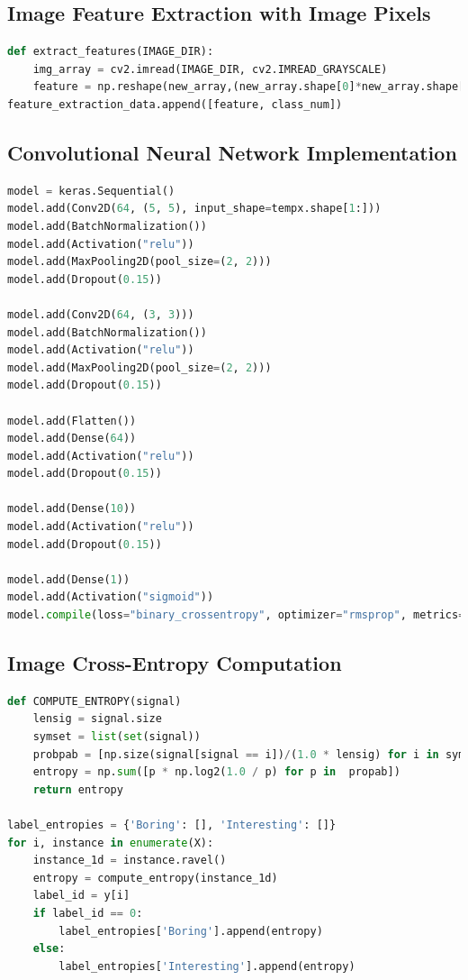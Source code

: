 \documentclass[12pt]{article}
\numberwithin{figure}{section} %
\begin{document}
\subsection{Image Feature Extraction with Image Pixels}
\begin{lstlisting}[language = Python]
def extract_features(IMAGE_DIR): 
    img_array = cv2.imread(IMAGE_DIR, cv2.IMREAD_GRAYSCALE)
    feature = np.reshape(new_array,(new_array.shape[0]*new_array.shape[1]))
feature_extraction_data.append([feature, class_num])  
\end{lstlisting}

\subsection{Convolutional Neural Network Implementation}
\begin{lstlisting}[language = Python]
model = keras.Sequential()
model.add(Conv2D(64, (5, 5), input_shape=tempx.shape[1:]))
model.add(BatchNormalization())
model.add(Activation("relu"))
model.add(MaxPooling2D(pool_size=(2, 2)))
model.add(Dropout(0.15))

model.add(Conv2D(64, (3, 3)))
model.add(BatchNormalization())
model.add(Activation("relu"))
model.add(MaxPooling2D(pool_size=(2, 2)))
model.add(Dropout(0.15))

model.add(Flatten())
model.add(Dense(64))
model.add(Activation("relu"))
model.add(Dropout(0.15))

model.add(Dense(10))
model.add(Activation("relu"))
model.add(Dropout(0.15))

model.add(Dense(1))
model.add(Activation("sigmoid"))
model.compile(loss="binary_crossentropy", optimizer="rmsprop", metrics=["accuracy"])
\end{lstlisting}

\subsection{Image Cross-Entropy Computation}
\begin{lstlisting}[language = Python]
def COMPUTE_ENTROPY(signal)
    lensig = signal.size
    symset = list(set(signal))
    probpab = [np.size(signal[signal == i])/(1.0 * lensig) for i in symset]
    entropy = np.sum([p * np.log2(1.0 / p) for p in  propab])
    return entropy

label_entropies = {'Boring': [], 'Interesting': []}
for i, instance in enumerate(X):
    instance_1d = instance.ravel()
    entropy = compute_entropy(instance_1d)
    label_id = y[i]
    if label_id == 0:
        label_entropies['Boring'].append(entropy)
    else:
        label_entropies['Interesting'].append(entropy)
\end{lstlisting}
\end{document}
